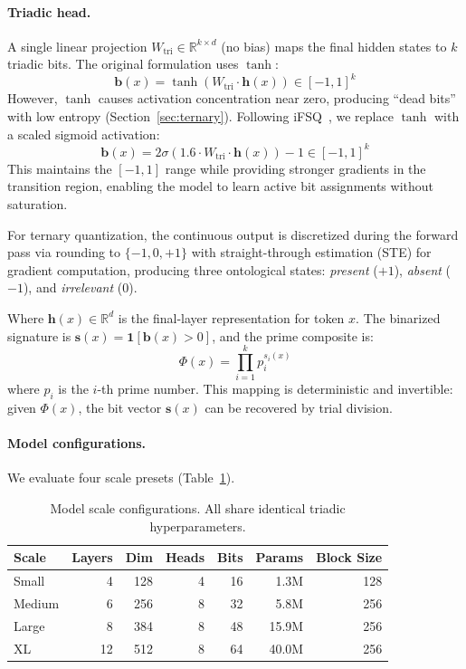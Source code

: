 \documentclass[11pt,a4paper]{article}
\begin{document}
\paragraph{Triadic head.} A single linear projection $W_{\text{tri}} \in \mathbb{R}^{k \times d}$ (no bias) maps the final hidden states to $k$ triadic bits. The original formulation uses $\tanh$:
\begin{equation}
    \mathbf{b}(x) = \tanh(W_{\text{tri}} \cdot \mathbf{h}(x)) \in [-1, 1]^k
    \label{eq:triadic_head}
\end{equation}
However, $\tanh$ causes activation concentration near zero, producing ``dead bits'' with low entropy (Section~\ref{sec:ternary}). Following iFSQ~\citep{li2025ifsq}, we replace $\tanh$ with a scaled sigmoid activation:
\begin{equation}
    \mathbf{b}(x) = 2\sigma(1.6 \cdot W_{\text{tri}} \cdot \mathbf{h}(x)) - 1 \in [-1, 1]^k
    \label{eq:ifsq_head}
\end{equation}
This maintains the $[-1,1]$ range while providing stronger gradients in the transition region, enabling the model to learn active bit assignments without saturation.

For ternary quantization, the continuous output is discretized during the forward pass via rounding to $\{-1, 0, +1\}$ with straight-through estimation (STE) for gradient computation, producing three ontological states: \emph{present} ($+1$), \emph{absent} ($-1$), and \emph{irrelevant} ($0$).

Where $\mathbf{h}(x) \in \mathbb{R}^d$ is the final-layer representation for token $x$. The binarized signature is $\mathbf{s}(x) = \mathbf{1}[\mathbf{b}(x) > 0]$, and the prime composite is:
\begin{equation}
    \Phi(x) = \prod_{i=1}^{k} p_i^{s_i(x)}
    \label{eq:prime_composite}
\end{equation}
where $p_i$ is the $i$-th prime number. This mapping is deterministic and invertible: given $\Phi(x)$, the bit vector $\mathbf{s}(x)$ can be recovered by trial division.

\paragraph{Model configurations.} We evaluate four scale presets (Table~\ref{tab:scales}).

\begin{table}[h]
\centering
\caption{Model scale configurations. All share identical triadic hyperparameters.}
\label{tab:scales}
\begin{tabular}{lrrrrrr}
\toprule
Scale & Layers & Dim & Heads & Bits & Params & Block Size \\
\midrule
Small  & 4  & 128 & 4 & 16 & 1.3M  & 128 \\
Medium & 6  & 256 & 8 & 32 & 5.8M  & 256 \\
Large  & 8  & 384 & 8 & 48 & 15.9M & 256 \\
XL     & 12 & 512 & 8 & 64 & 40.0M & 256 \\
\bottomrule
\end{tabular}
\end{table}
\end{document}
